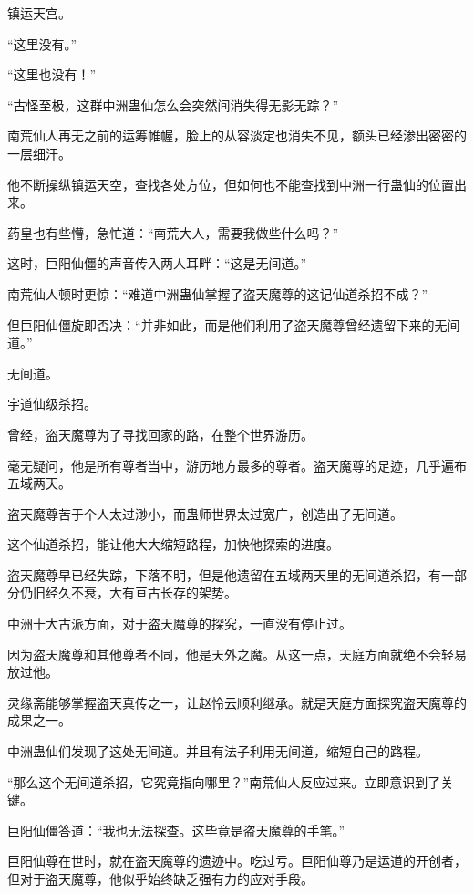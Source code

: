 
\begin{this_body}



镇运天宫。

“这里没有。”

“这里也没有！”

“古怪至极，这群中洲蛊仙怎么会突然间消失得无影无踪？”

南荒仙人再无之前的运筹帷幄，脸上的从容淡定也消失不见，额头已经渗出密密的一层细汗。

他不断操纵镇运天空，查找各处方位，但如何也不能查找到中洲一行蛊仙的位置出来。

药皇也有些懵，急忙道：“南荒大人，需要我做些什么吗？”

这时，巨阳仙僵的声音传入两人耳畔：“这是无间道。”

南荒仙人顿时更惊：“难道中洲蛊仙掌握了盗天魔尊的这记仙道杀招不成？”

但巨阳仙僵旋即否决：“并非如此，而是他们利用了盗天魔尊曾经遗留下来的无间道。”

无间道。

宇道仙级杀招。

曾经，盗天魔尊为了寻找回家的路，在整个世界游历。

毫无疑问，他是所有尊者当中，游历地方最多的尊者。盗天魔尊的足迹，几乎遍布五域两天。

盗天魔尊苦于个人太过渺小，而蛊师世界太过宽广，创造出了无间道。

这个仙道杀招，能让他大大缩短路程，加快他探索的进度。

盗天魔尊早已经失踪，下落不明，但是他遗留在五域两天里的无间道杀招，有一部分仍旧经久不衰，大有亘古长存的架势。

中洲十大古派方面，对于盗天魔尊的探究，一直没有停止过。

因为盗天魔尊和其他尊者不同，他是天外之魔。从这一点，天庭方面就绝不会轻易放过他。

灵缘斋能够掌握盗天真传之一，让赵怜云顺利继承。就是天庭方面探究盗天魔尊的成果之一。

中洲蛊仙们发现了这处无间道。并且有法子利用无间道，缩短自己的路程。

“那么这个无间道杀招，它究竟指向哪里？”南荒仙人反应过来。立即意识到了关键。

巨阳仙僵答道：“我也无法探查。这毕竟是盗天魔尊的手笔。”

巨阳仙尊在世时，就在盗天魔尊的遗迹中。吃过亏。巨阳仙尊乃是运道的开创者，但对于盗天魔尊，他似乎始终缺乏强有力的应对手段。


\end{this_body}
